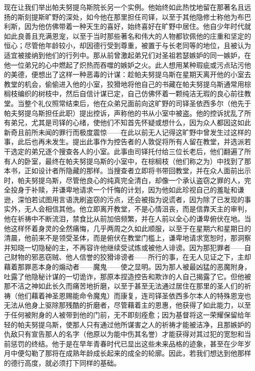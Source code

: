 \par

现在让我们举出帕夫努提乌斯院长另一个实例。他始终如此热忱地留在那著名且远扬的斯刻提斯旷野的深处，如今他在那里担任司铎，以至于其他隐修士称他为布巴利斯，因为他仿佛带着一种天生的喜好，始终喜好在旷野中居住。他自少年时代就如此良善且充满恩宠，以至于当时那些著名和伟大的人物都钦佩他的庄重和坚定的恒心；尽管他年龄较小，却因德行受到尊重，被置于与长老同等的地位，且被认为适宜被接纳到他们的行列中。那从前曾激起弟兄们对圣祖若瑟嫉妒的同一嫉妒，在他一位弟兄的心中燃起了炽热而吞噬的嫉妒之火。此人想用某种瑕疵或污点玷污他的美德，便想出了这样一种恶毒的计谋：趁帕夫努提乌斯在星期天离开他的小室去教堂的机会，偷偷进入他的小室，狡猾地将他自己的书藏在帕夫努提乌斯通常用棕榈枝编织的树枝中，然后自信计谋已定，自己仿佛怀着一颗纯洁无瑕的良心前往教堂。当整个礼仪照常结束后，他在众弟兄面前向这旷野的司铎圣依西多尔（他先于帕夫努提乌斯担任此职）提出控诉，声称他的书从小室中被盗。他的控诉扰乱了所有弟兄，尤其是司铎的心绪，使他们不知首先怀疑或想什么，因为众人都因这如此新奇且前所未闻的罪行而极度震惊——在此以前无人记得这旷野中曾发生过这样的事，此后也再未发生。提出此事作为控告者的人敦促将所有人留在教堂，并选派若干选定的弟兄逐个搜查各人的小室。此事由司铎托付给三位长老后，他们翻遍了所有人的卧室，最终在帕夫努提乌斯的小室中，在棕榈枝（他们称之为）中找到了那本书，正如设计者所隐藏的那样。当搜查者立即将书带回教堂，并在众人面前出示时，帕夫努提乌斯，尽管他良心的纯真完全清白，却像一个承认盗窃之罪的人，完全投身于补赎，并谦卑地请求一个忏悔的计划，因为他如此珍视自己的羞耻和谦逊，深怕若试图用言语洗刷盗窃的污点，还会被指为说谎者，因为除了已发现的事实外，无人会相信其他。他立即离开教堂，不是心情沮丧，而是信靠天主的审判，他在祈祷中不断流泪，禁食比从前加倍频繁，并在人前以全心的谦卑俯伏在地。当他这样怀着身灵的全然痛悔，几乎两周之久如此顺服，以至于在星期六和星期日的清晨，他前来不是领受圣体，而是俯伏在教堂门槛上，谦卑地请求宽恕时，那洞察并知晓一切隐秘的主，不再容许他继续受试炼或被他人诽谤。因为那犯罪者——自己财物的邪恶窃贼、他人信誉的狡猾诽谤者——所行的事，在无人见证之下，主却藉着那罪恶本身的煽动者——魔鬼——使之显明。因为那人被最凶猛的恶魔附身，吐露了他隐秘计谋的一切诡诈，那原本捏造控告和欺诈的人自己揭露了它。但他被那不洁之神如此长久而痛苦地折磨，以至于甚至无法通过居住在那里的圣人们的祈祷（他们藉着神圣恩赐能命令魔鬼）而康复，连司铎圣依西多尔本人的特殊恩宠也无法从他身上驱除那残酷的折磨者，尽管藉着主的恩惠，他获得了如此能力，以至于任何被附身的人被带到他的门前，无不即刻痊愈；因为基督将这一荣耀保留给年轻的帕夫努提乌斯，使那人只有通过他所谋害之人的祈祷才能被洁净，且那嫉妒的仇敌只有宣告那人的名字（他原以为能中伤其名誉）才能获得对其过犯的宽恕和当前惩罚的终结。他于是在早年青春时代已显出这些未来品格的迹象，甚至在少年岁月中便勾勒了那将在成熟年龄成长起来的成全的轮廓。因此，若我们想达到他那样的德行高度，就必须打下同样的基础。\par

